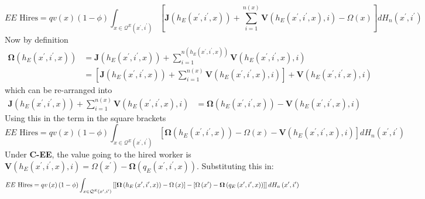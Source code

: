 \begin{equation*}
\text{$EE$ Hires}=qv\left( x\right) \left( 1-\phi \right) \int_{x\in
\mathcal{Q}^{E}\left( x^{\prime },i^{\prime }\right) }\left[ \boldsymbol{J}%
\left( h_{E}\left( x^{\prime },i^{\prime },x\right) \right)
+\sum\limits_{i=1}^{n\left( x\right) }\boldsymbol{V}\left( h_{E}\left( x^{\prime
},i^{\prime },x\right) ,i\right) -\Omega \left( x\right) \right] dH_n\left(
x^{\prime },i^{\prime }\right)
\end{equation*}%
Now by definition
\begin{align*}
\boldsymbol{\Omega }\left( h_{E}\left( x^{\prime },i^{\prime },x\right) \right)
& =\boldsymbol{J}\left( h_{E}\left( x^{\prime },i^{\prime },x\right) \right)
+\sum\limits_{i=1}^{n\left( h_{E}\left( x^{\prime },i^{\prime },x\right)
\right) }\boldsymbol{V}\left( h_{E}\left( x^{\prime },i^{\prime },x\right)
,i\right) \\
& =\left[ \boldsymbol{J}\left( h_{E}\left( x^{\prime },i^{\prime },x\right)
\right) +\sum\limits_{i=1}^{n\left( x\right) }\boldsymbol{V}\left( h_{E}\left(
x^{\prime },i^{\prime },x\right) ,i\right) \right] +\boldsymbol{V}\left(
h_{E}\left( x^{\prime },i^{\prime },x\right) ,i\right)
\end{align*}
which can be re-arranged into
\begin{align*}
\boldsymbol{J}\left( h_{E}\left( x^{\prime },i^{\prime },x\right) \right)
+\sum\limits_{i=1}^{n\left( x\right) }\boldsymbol{V}\left( h_{E}\left( x^{\prime
},i^{\prime },x\right) ,i\right) & =\boldsymbol{\Omega }\left( h_{E}\left(
x^{\prime },i^{\prime },x\right) \right) -\boldsymbol{V}\left( h_{E}\left(
x^{\prime },i^{\prime },x\right) ,i\right)
\end{align*}%
Using this in the term in the square brackets
\begin{equation*}
\text{$EE$ Hires}=qv\left( x\right) \left( 1-\phi \right) \int_{x\in
\mathcal{Q}^{E}\left( x^{\prime },i^{\prime }\right) }\left[ \boldsymbol{\Omega }%
\left( h_{E}\left( x^{\prime },i^{\prime },x\right) \right) -\Omega \left(
x\right) -\boldsymbol{V}\left( h_{E}\left( x^{\prime },i^{\prime },x\right)
,i\right) \right] dH_n\left( x^{\prime },i^{\prime }\right)
\end{equation*}%
Under \textbf{C-EE}, the value going to the hired worker is $\boldsymbol{V}%
\left( h_{E}\left( x^{\prime },i^{\prime },x\right) ,i\right) =\Omega \left(
x^{\prime }\right) -\boldsymbol{\Omega }\left( q_{E}\left( x^{\prime },i^{\prime
},x\right) \right) $. Substituting this in:
\begin{equation*}
\text{$EE$ Hires}=qv\left( x\right) \left( 1-\phi \right) \int_{x\in
\mathcal{Q}^{E}\left( x^{\prime },i^{\prime }\right) }\left[ \left[ \boldsymbol{%
\Omega }\left( h_{E}\left( x^{\prime },i^{\prime },x\right) \right) -\Omega
\left( x\right) \right] -\left[ \Omega \left( x^{\prime }\right) -\boldsymbol{%
\Omega }\left( q_{E}\left( x^{\prime },i^{\prime },x\right) \right) \right] %
\right] dH_n\left( x^{\prime },i^{\prime }\right)
\end{equation*}

